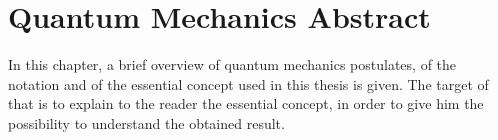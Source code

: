 \chapter{Quantum Mechanics Abstract}
    In this chapter, a brief overview of quantum mechanics postulates,
    of the notation and of the essential concept used in this thesis is given. 
    The target of that is to explain to the reader the essential concept, in 
    order to give him the possibility to understand the obtained result.

    

    

    

    